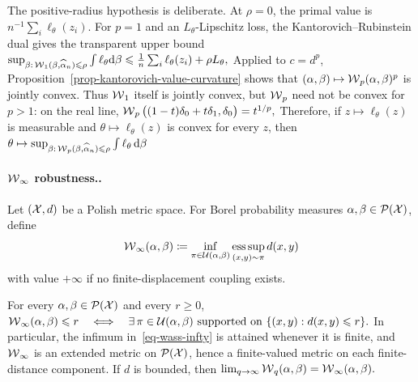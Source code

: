 The positive-radius hypothesis is deliberate. At $\rho=0$, the primal value is $n^{-1}\sum_i\ell_\theta(z_i)$. For $p=1$ and an $L_\theta$-Lipschitz loss, the Kantorovich--Rubinstein dual gives the transparent upper bound
\(\sup_{\beta:\,\operatorname{\mathcal{W}}_1(\beta,\widehat{\alpha}_n)\leqslant \rho} \int \ell_\theta\mathrm{d}\beta \leqslant \frac1n\sum_i\ell_\theta(z_i)+\rho L_\theta,\)
Applied to $c=d^p$, Proposition~\ref{prop-kantorovich-value-curvature} shows that $(\alpha,\beta)\mapsto\operatorname{\mathcal{W}}_p(\alpha,\beta)^p$ is jointly convex. Thus $\operatorname{\mathcal{W}}_1$ itself is jointly convex, but $\operatorname{\mathcal{W}}_p$ need not be convex for $p>1$: on the real line,
\(\operatorname{\mathcal{W}}_p\big((1-t)\delta_0+t\delta_1,\delta_0\big)=t^{1/p},\)
Therefore, if $z\mapsto\ell_\theta(z)$ is measurable and $\theta\mapsto\ell_\theta(z)$ is convex for every $z$, then
\(\theta\mapsto \sup_{\beta:\,\operatorname{\mathcal{W}}_p(\beta,\widehat{\alpha}_n)\leqslant\rho} \int \ell_\theta\,\mathrm{d}\beta\)
\paragraph{\texorpdfstring{$\operatorname{\mathcal{W}}_\infty$}{W-infinity} robustness..}
\begin{defn}\label{def-wasserstein-infinity}
Let $(\mathcal{X},d)$ be a Polish metric space. For Borel probability measures $\alpha,\beta\in\mathcal{P}(\mathcal{X})$, define
\begin{equation}\label{eq-wass-infty}
\operatorname{\mathcal{W}}_\infty(\alpha,\beta)
\coloneqq
\inf_{\pi\in\mathcal{U}(\alpha,\beta)}
\operatorname*{ess\,sup}_{(x,y)\sim\pi} d(x,y)
\end{equation}
with value $+\infty$ if no finite-displacement coupling exists.
\end{defn}
\begin{prop}\label{prop-wasserstein-infinity-metric}
For every $\alpha,\beta\in\mathcal{P}(\mathcal{X})$ and every $r\geq0$, \(\operatorname{\mathcal{W}}_\infty(\alpha,\beta)\leqslant r \quad\Longleftrightarrow\quad \exists\,\pi\in\mathcal{U}(\alpha,\beta) \text{ supported on }\{(x,y):d(x,y)\leqslant r\}.\)
In particular, the infimum in~\eqref{eq-wass-infty} is attained whenever it is finite, and $\operatorname{\mathcal{W}}_\infty$ is an extended metric on $\mathcal{P}(\mathcal{X})$, hence a finite-valued metric on each finite-distance component. If $d$ is bounded, then
\(\lim_{q\to\infty}\operatorname{\mathcal{W}}_q(\alpha,\beta)=\operatorname{\mathcal{W}}_\infty(\alpha,\beta).\)
\end{prop}
